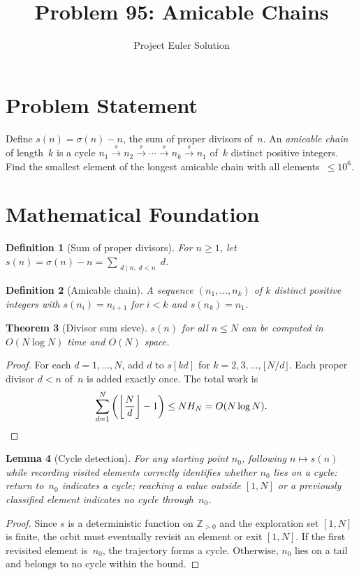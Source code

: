 \documentclass[12pt]{article}
\title{Problem 95: Amicable Chains}
\author{Project Euler Solution}
\date{}
\newtheorem{theorem}{Theorem}
\newtheorem{lemma}[theorem]{Lemma}
\newtheorem{definition}[theorem]{Definition}
\begin{document}
\maketitle

\section{Problem Statement}
Define $s(n) = \sigma(n) - n$, the sum of proper divisors of~$n$. An \emph{amicable chain} of length~$k$ is a cycle $n_1 \xrightarrow{s} n_2 \xrightarrow{s} \cdots \xrightarrow{s} n_k \xrightarrow{s} n_1$ of~$k$ distinct positive integers. Find the smallest element of the longest amicable chain with all elements~$\le 10^6$.

\section{Mathematical Foundation}

\begin{definition}[Sum of proper divisors]
For $n \ge 1$, let $s(n) = \sigma(n) - n = \sum_{\substack{d \mid n,\; d < n}} d$.
\end{definition}

\begin{definition}[Amicable chain]
A sequence $(n_1, \ldots, n_k)$ of $k$ distinct positive integers with $s(n_i) = n_{i+1}$ for $i < k$ and $s(n_k) = n_1$.
\end{definition}

\begin{theorem}[Divisor sum sieve]
\label{thm:sieve}
$s(n)$ for all $n \le N$ can be computed in $O(N \log N)$ time and $O(N)$ space.
\end{theorem}
\begin{proof}
For each $d = 1, \ldots, N$, add $d$ to $s[kd]$ for $k = 2, 3, \ldots, \lfloor N/d \rfloor$. Each proper divisor $d < n$ of~$n$ is added exactly once. The total work is
\[
\sum_{d=1}^{N} \left(\left\lfloor \frac{N}{d} \right\rfloor - 1\right) \le N H_N = O(N \log N). \qedhere
\]
\end{proof}

\begin{lemma}[Cycle detection]
\label{lem:cycle}
For any starting point $n_0$, following $n \mapsto s(n)$ while recording visited elements correctly identifies whether $n_0$ lies on a cycle: return to~$n_0$ indicates a cycle; reaching a value outside $[1, N]$ or a previously classified element indicates no cycle through~$n_0$.
\end{lemma}
\begin{proof}
Since $s$ is a deterministic function on $\mathbb{Z}_{>0}$ and the exploration set $[1, N]$ is finite, the orbit must eventually revisit an element or exit $[1, N]$. If the first revisited element is~$n_0$, the trajectory forms a cycle. Otherwise, $n_0$ lies on a tail and belongs to no cycle within the bound.
\end{proof}
\end{document}
